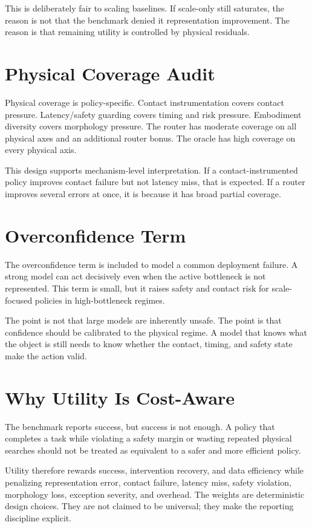 This is deliberately fair to scaling baselines. If scale-only still saturates, the reason is not that the benchmark denied it representation improvement. The reason is that remaining utility is controlled by physical residuals.

\section{Physical Coverage Audit}

Physical coverage is policy-specific. Contact instrumentation covers contact pressure. Latency/safety guarding covers timing and risk pressure. Embodiment diversity covers morphology pressure. The router has moderate coverage on all physical axes and an additional router bonus. The oracle has high coverage on every physical axis.

This design supports mechanism-level interpretation. If a contact-instrumented policy improves contact failure but not latency miss, that is expected. If a router improves several errors at once, it is because it has broad partial coverage.

\section{Overconfidence Term}

The overconfidence term is included to model a common deployment failure. A strong model can act decisively even when the active bottleneck is not represented. This term is small, but it raises safety and contact risk for scale-focused policies in high-bottleneck regimes.

The point is not that large models are inherently unsafe. The point is that confidence should be calibrated to the physical regime. A model that knows what the object is still needs to know whether the contact, timing, and safety state make the action valid.

\section{Why Utility Is Cost-Aware}

The benchmark reports success, but success is not enough. A policy that completes a task while violating a safety margin or wasting repeated physical searches should not be treated as equivalent to a safer and more efficient policy.

Utility therefore rewards success, intervention recovery, and data efficiency while penalizing representation error, contact failure, latency miss, safety violation, morphology loss, exception severity, and overhead. The weights are deterministic design choices. They are not claimed to be universal; they make the reporting discipline explicit.

